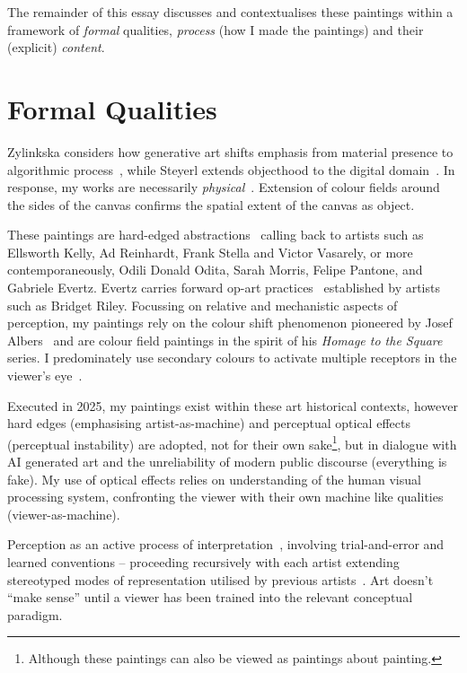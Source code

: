\documentclass[12pt]{article}
\begin{document}
The remainder of this essay discusses and contextualises these
paintings within a framework of \emph{formal} qualities,
\emph{process} (how I made the paintings) and their (explicit)
\emph{content}.

\section{Formal Qualities}
Zylinkska considers how generative art shifts emphasis from material
presence to algorithmic process~\cite{zylinska2020ai}, while Steyerl
extends objecthood to the digital domain~\cite{steyerl2017duty}. In
response, my works are necessarily
\emph{physical}~\cite{fontana1947spatial,merleauponty1964eye}. Extension
of colour fields around the sides of the canvas confirms the spatial
extent of the canvas as object.

These paintings are hard-edged
abstractions~\cite{Greenberg1961,Alloway1975,Judd1965,Fried1968}
calling back to artists such as Ellsworth Kelly, Ad Reinhardt, Frank
Stella and Victor Vasarely, or more contemporaneously, Odili Donald
Odita, Sarah Morris, Felipe Pantone, and Gabriele Evertz. Evertz
carries forward op-art
practices~\cite{Follin2004EmbodiedVisions,Riley2019EyesMind,Riley2019DialoguesOnArt,Seitz1965ResponsiveEye}
established by artists such as Bridget Riley. Focussing on relative
and mechanistic aspects of perception, my paintings rely on the colour
shift phenomenon pioneered by Josef Albers~\cite{albers} and are
colour field paintings in the spirit of his \emph{Homage to the
  Square} series. I predominately use secondary colours to activate
multiple receptors in the viewer's
eye~\cite{HurvichJameson1957,Land1977,SchnapfKraftBaylor1987}.

Executed in 2025, my paintings exist within these art historical
contexts, however hard edges (emphasising artist-as-machine) and
perceptual optical effects (perceptual instability) are
adopted, not for their own sake\footnote{Although these paintings can
  also be viewed as paintings about painting.}, but in dialogue with
AI generated art and the unreliability of modern public discourse
(everything is fake). My use of optical effects relies on
understanding of the human visual processing system, confronting the
viewer with their own machine like qualities (viewer-as-machine).

Perception as an active process of
interpretation~\cite{popper1972objective}, involving trial-and-error
and learned conventions -- proceeding recursively with each artist
extending stereotyped modes of representation utilised by previous
artists~\cite{gombrich1960art}.  Art doesn't ``make sense'' until a
viewer has been trained into the relevant conceptual paradigm.
\end{document}
